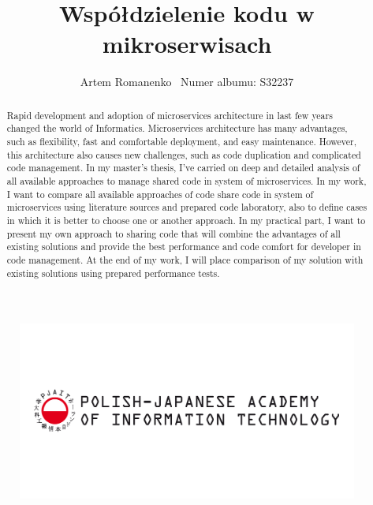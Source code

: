 \documentclass[runningheads,12pt]{llncs}
\begin{document}
\title{Współdzielenie kodu w mikroserwisach} \subtitle{}

\author{Artem Romanenko \ Numer albumu: S32237 \inst{}}
\authorrunning{ }

\maketitle

\thispagestyle{fancy}

\begin{figure}[t!]
    \centering
    \includegraphics[width=\linewidth]{images/Logo_EN_1.png}
    \label{fig:my_label}
\end{figure}


\clearpage

\makeatletter
\renewcommand*\l@author[2]{}
\renewcommand*\l@title[2]{}
\makeatletter

\begin{abstract}
Rapid development and adoption of microservices architecture in last few years changed the world of Informatics. Microservices architecture has many advantages, such as flexibility, fast and comfortable deployment, and easy maintenance. However, this architecture also causes new challenges, such as code duplication and complicated code management. In my master's thesis, I've carried on deep and detailed analysis of all available approaches to manage shared code in system of microservices. In my work, I want to compare all available approaches of code share code in system of microservices using literature sources and prepared code laboratory, also to define cases in which it is better to choose one or another approach. In my practical part, I want to present my own approach to sharing code that will combine the advantages of all existing solutions and provide the best performance and code comfort for developer in code management. At the end of my work, I will place comparison of my solution with existing solutions using prepared performance tests.
\end{abstract}
\end{document}
